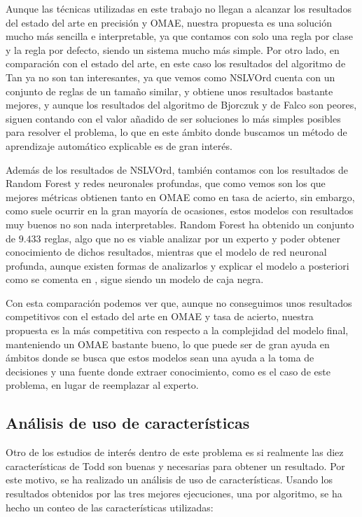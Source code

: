 Aunque las técnicas utilizadas en este trabajo no llegan a alcanzar los resultados del estado del arte en precisión y OMAE, nuestra propuesta es una solución mucho más sencilla e interpretable, ya que contamos con solo una regla por clase y la regla por defecto, siendo un sistema mucho más simple. Por otro lado, en comparación con el estado del arte, en este caso los resultados del algoritmo de Tan ya no son tan interesantes, ya que vemos como NSLVOrd cuenta con un conjunto de reglas de un tamaño similar, y obtiene unos resultados bastante mejores, y aunque los resultados del algoritmo de Bjorczuk y de Falco son peores, siguen contando con el valor añadido de ser soluciones lo más simples posibles para resolver el problema, lo que en este ámbito donde buscamos un método de aprendizaje automático explicable es de gran interés.

Además de los resultados de NSLVOrd, también contamos con los resultados de Random Forest y redes neuronales profundas, que como vemos son los que mejores métricas obtienen tanto en OMAE como en tasa de acierto, sin embargo, como suele ocurrir en la gran mayoría de ocasiones, estos modelos con resultados muy buenos no son nada interpretables. Random Forest ha obtenido un conjunto de $9.433$ reglas, algo que no es viable analizar por un experto y poder obtener conocimiento de dichos resultados, mientras que el modelo de red neuronal profunda, aunque existen formas de analizarlos y explicar el modelo a posteriori como se comenta en \cite{XAI}, sigue siendo un modelo de caja negra.

Con esta comparación podemos ver que, aunque no conseguimos unos resultados competitivos con el estado del arte en OMAE y tasa de acierto, nuestra propuesta es la más competitiva con respecto a la complejidad del modelo final, manteniendo un OMAE bastante bueno, lo que puede ser de gran ayuda en ámbitos donde se busca que estos modelos sean una ayuda a la toma de decisiones y una fuente donde extraer conocimiento, como es el caso de este problema, en lugar de reemplazar al experto.

\newpage

\subsection{Análisis de uso de características}

Otro de los estudios de interés dentro de este problema es si realmente las diez características de Todd son buenas y necesarias para obtener un resultado. Por este motivo, se ha realizado un análisis de uso de características. Usando los resultados obtenidos por las tres mejores ejecuciones, una por algoritmo, se ha hecho un conteo de las características utilizadas:

